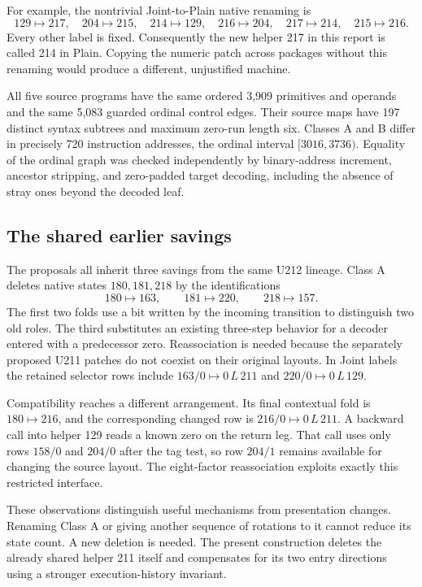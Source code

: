 \documentclass[11pt,letterpaper]{article}
\newcommand{\act}[3]{#1\,#2\,#3}
\begin{document}
For example, the nontrivial Joint-to-Plain native renaming is
\[
129\mapsto217,\quad204\mapsto215,\quad214\mapsto129,\quad
216\mapsto204,\quad217\mapsto214,\quad215\mapsto216.
\]
Every other label is fixed. Consequently the new helper 217 in this report
is called 214 in Plain. Copying the numeric patch across packages without
this renaming would produce a different, unjustified machine.

All five source programs have the same ordered 3,909 primitives and operands
and the same 5,083 guarded ordinal control edges. Their source maps have
197 distinct syntax subtrees and maximum zero-run length six. Classes A
and B differ in precisely 720 instruction addresses, the ordinal interval
$[3016,3736)$. Equality of the ordinal graph was checked independently by
binary-address increment, ancestor stripping, and zero-padded target
decoding, including the absence of stray ones beyond the decoded leaf.

\subsection{The shared earlier savings}

The proposals all inherit three savings from the same U212 lineage. Class A
deletes native states $180,181,218$ by the identifications
\[
 180\mapsto163,\qquad181\mapsto220,\qquad218\mapsto157.
\]
The first two folds use a bit written by the incoming transition to
distinguish two old roles. The third substitutes an existing three-step
behavior for a decoder entered with a predecessor zero. Reassociation is
needed because the separately proposed U211 patches do not coexist on their
original layouts. In Joint labels the retained selector rows include
$163/0\mapsto\act0L{211}$ and $220/0\mapsto\act0L{129}$.

Compatibility reaches a different arrangement. Its final contextual fold
is $180\mapsto216$, and the corresponding changed row is
$216/0\mapsto\act0L{211}$. A backward call into helper 129 reads a known
zero on the return leg. That call uses only rows $158/0$ and $204/0$ after
the tag test, so row $204/1$ remains available for changing the source layout.
The eight-factor reassociation exploits exactly this restricted interface.

These observations distinguish useful mechanisms from presentation changes.
Renaming Class A or giving another sequence of rotations to it cannot
reduce its state count. A new deletion is needed. The present construction
deletes the already shared helper 211 itself and compensates for its two
entry directions using a stronger execution-history invariant.
\end{document}
